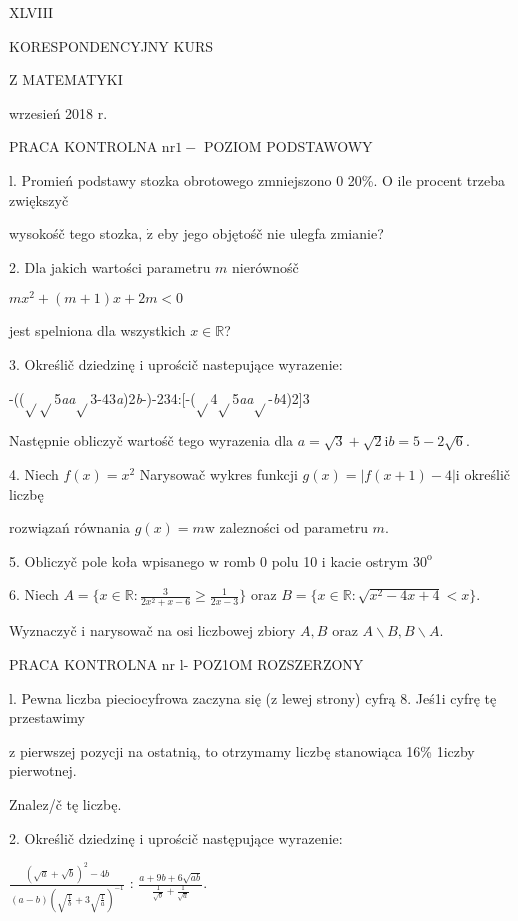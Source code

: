 \documentclass[a4paper,12pt]{article}
\begin{document}
XLVIII

KORESPONDENCYJNY KURS

Z MATEMATYKI

wrzesień 2018 r.

PRACA KONTROLNA $\mathrm{n}\mathrm{r} 1 -$ POZIOM PODSTAWOWY

l. Promień podstawy stozka obrotowego zmniejszono $0$ 20\%. $\mathrm{O}$ ile procent trzeba zwiększyč

wysokośč tego stozka, $\dot{\mathrm{z}}$ eby jego objętośč nie ulegfa zmianie?

2. Dla jakich wartości parametru $m$ nierównośč

$mx^{2}+(m+1)x+2m<0$

jest spelniona dla wszystkich $x\in \mathbb{R}$?

3. Określič dziedzinę $\mathrm{i}$ uprościč nastepujące wyrazenie:

-(($\sqrt{}\sqrt{}$5{\it aa}$\sqrt{}$3-43{\it a})2{\it b}-)-234:[-($\sqrt{}$4$\sqrt{}$5{\it aa}$\sqrt{}$-{\it b}4)2]3

Następnie obliczyč wartośč tego wyrazenia dla $a=\sqrt{3}+\sqrt{2} \mathrm{i} b=5-2\sqrt{6}.$

4. Niech $f(x) = x^{2}$ Narysowač wykres funkcji $g(x) = |f(x+1) -4| \mathrm{i}$ określič liczbę

rozwiązań równania $g(x)=m\mathrm{w}$ zalezności od parametru $m.$

5. Obliczyč pole koła wpisanego $\mathrm{w}$ romb $0$ polu 10 $\mathrm{i}$ kacie ostrym $30^{\mathrm{o}}$

6. Niech $A = \displaystyle \{x\in \mathbb{R}:\frac{3}{2x^{2}+x-6}\geq\frac{1}{2x-3}\}$ oraz $B = \{x\in \mathbb{R}:\sqrt{x^{2}-4x+4}<x\}.$

Wyznaczyč $\mathrm{i}$ narysowač na osi liczbowej zbiory $A, B$ oraz $A\backslash B, B\backslash A.$




PRACA KONTROLNA nr l- POZ1OM ROZSZERZONY

l. Pewna liczba pieciocyfrowa zaczyna się ($\mathrm{z}$ lewej strony) cyfrą 8. Jeś1i cyfrę tę przestawimy

$\mathrm{z}$ pierwszej pozycji na ostatnią, to otrzymamy liczbę stanowiąca 16\% 1iczby pierwotnej.

Znalez/č tę liczbę.

2. Określič dziedzinę $\mathrm{i}$ uprościč następujące wyrazenie:

$\displaystyle \frac{(\sqrt{a}+\sqrt{b})^{2}-4b}{(a-b)(\sqrt{\frac{1}{b}}+3\sqrt{\frac{1}{a}})^{-1}}$ : $\displaystyle \frac{a+9b+6\sqrt{ab}}{\frac{1}{\sqrt{b}}+\frac{1}{\sqrt{a}}}.$
\end{document}

